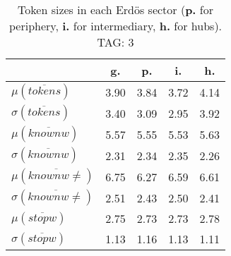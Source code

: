 \begin{table}[h!]
\begin{center}
\begin{tabular}{| l | c | c | c | c |}\hline
 & g. & p. & i. & h. \\\hline
$\mu(\overline{tokens})$ & 3.90  & 3.84  & 3.72  & 4.14 \\\hline
$\sigma(\overline{tokens})$ & 3.40  & 3.09  & 2.95  & 3.92 \\\hline
$\mu(\overline{knownw})$ & 5.57  & 5.55  & 5.53  & 5.63 \\\hline
$\sigma(\overline{knownw})$ & 2.31  & 2.34  & 2.35  & 2.26 \\\hline
$\mu(\overline{knownw \neq})$ & 6.75  & 6.27  & 6.59  & 6.61 \\\hline
$\sigma(\overline{knownw \neq})$ & 2.51  & 2.43  & 2.50  & 2.41 \\\hline
$\mu(\overline{stopw})$ & 2.75  & 2.73  & 2.73  & 2.78 \\\hline
$\sigma(\overline{stopw})$ & 1.13  & 1.16  & 1.13  & 1.11 \\\hline
\end{tabular}
\caption{Token sizes in each Erd\"os sector ({{\bf p.}} for periphery, {{\bf i.}} for intermediary, {{\bf h.}} for hubs). TAG: 3}
\end{center}
\end{table}